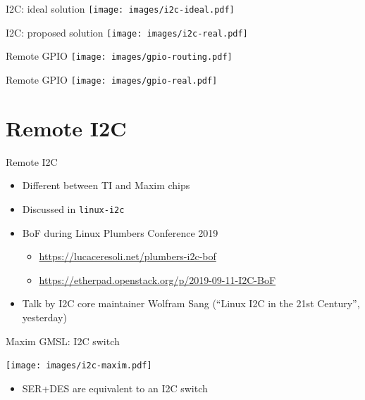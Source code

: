 \documentclass[xetex,table,aspectratio=169]{beamer}
\begin{document}
\begin{frame}{I2C: ideal solution}
  \center\texttt{[image: images/i2c-ideal.pdf]}
\end{frame}

\begin{frame}{I2C: proposed solution}
  \center\texttt{[image: images/i2c-real.pdf]}
\end{frame}

\begin{frame}{Remote GPIO}
  \center\texttt{[image: images/gpio-routing.pdf]}
\end{frame}

\begin{frame}{Remote GPIO}
  \center\texttt{[image: images/gpio-real.pdf]}
\end{frame}


\section{Remote I2C}

\begin{frame}{Remote I2C}
  \begin{itemize}
  \item Different between TI and Maxim chips
  \item Discussed in {\tt linux-i2c}
  \item BoF during Linux Plumbers Conference 2019
    \begin{itemize}
    \item \url{https://lucaceresoli.net/plumbers-i2c-bof}
    \item \url{https://etherpad.openstack.org/p/2019-09-11-I2C-BoF}
    \end{itemize}
  \item Talk by I2C core maintainer Wolfram Sang (``Linux I2C in the
    21st Century'', yesterday)
  \end{itemize}
\end{frame}

\begin{frame}{Maxim GMSL: I2C switch}
  \begin{center}
    \texttt{[image: images/i2c-maxim.pdf]}
  \end{center}

  \begin{itemize}
  \item SER+DES are equivalent to an I2C switch
  \end{itemize}
\end{frame}
\end{document}
